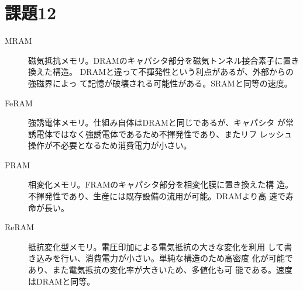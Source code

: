 \documentclass[a4j,9pt]{jsarticle}
\begin{document}
\section{課題12}
\begin{description}
 \item[MRAM] 磁気抵抗メモリ。DRAMのキャパシタ部分を磁気トンネル接合素子に置き換えた構造。
            DRAMと違って不揮発性という利点があるが、外部からの強磁界によっ
            て記憶が破壊される可能性がある。SRAMと同等の速度。
 \item[FeRAM] 強誘電体メモリ。仕組み自体はDRAMと同じであるが、キャパシタ
            が常誘電体ではなく強誘電体であるため不揮発性であり、またリフ
            レッシュ操作が不必要となるため消費電力が小さい。
 \item[PRAM] 相変化メモリ。FRAMのキャパシタ部分を相変化膜に置き換えた構
            造。不揮発性であり、生産には既存設備の流用が可能。DRAMより高
            速で寿命が長い。
 \item[ReRAM] 抵抗変化型メモリ。電圧印加による電気抵抗の大きな変化を利用
            して書き込みを行い、消費電力が小さい。単純な構造のため高密度
            化が可能であり、また電気抵抗の変化率が大きいため、多値化も可
            能である。速度はDRAMと同等。

\end{description}
\end{document}
